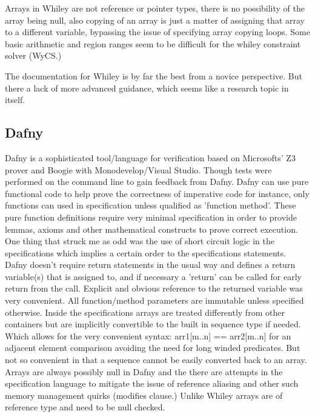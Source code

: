 \documentclass[10pt]{article} %
\begin{document}
Arrays in Whiley are not reference or pointer types, there is no possibility of the array being null, also copying of an array is just a matter of assigning that array to a different variable, bypassing the issue of specifying array copying loops. Some basic arithmetic and region ranges seem to be difficult for the whiley constraint solver (WyCS.)

The documentation for Whiley is by far the best from a novice perspective. But there a lack of more advanced guidance, which seems like a research topic in itself.
\subsection{Dafny}
	Dafny is a sophisticated tool\slash language for verification based on Microsofts' Z3 prover and Boogie with Monodevelop\slash Visual Studio. Though tests were performed on the command line to gain feedback from Dafny. Dafny can use pure functional code to help prove the correctness of imperative code for instance, only functions can used in specification unless qualified as 'function method'. These pure function definitions require very minimal specification in order to provide lemmas, axioms and other mathematical constructs to prove correct execution. One thing that struck me as odd was the use of short circuit logic in the specifications which implies a certain order to the specifications statements. Dafny doesn't require return statements in the usual way and defines a return variable(s) that is assigned to, and if necessary a 'return' can be called for early return from the call. Explicit and obvious reference to the returned variable was very convenient. All function\slash method parameters are immutable unless specified otherwise.
	Inside the specifications arrays are treated differently from other containers but are implicitly convertible to the built in sequence type if needed. Which allows for the very convenient syntax: arr1[m..n] == arr2[m..n] for an adjacent element comparison avoiding the need for long winded predicates. But not so convenient in that a sequence cannot be easily converted back to an array. Arrays are always possibly null in Dafny and the there are attempts in the specification language to mitigate the issue of reference aliasing and other such memory management quirks (modifies clause.) Unlike Whiley arrays are of reference type and need to be null checked.
\end{document}

